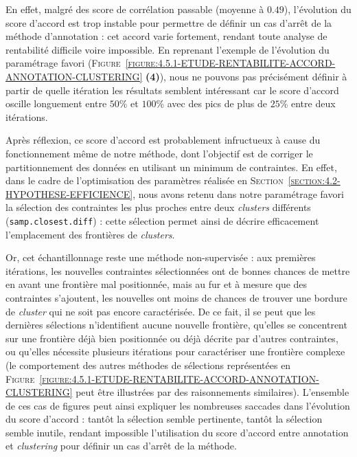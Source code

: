 			En effet, malgré des score de corrélation passable (moyenne à $0.49$), l'évolution du score d'accord est trop instable pour permettre de définir un cas d'arrêt de la méthode d'annotation : cet accord varie fortement, rendant toute analyse de rentabilité difficile voire impossible.
			En reprenant l'exemple de l'évolution du paramétrage favori (\textsc{Figure~\ref{figure:4.5.1-ETUDE-RENTABILITE-ACCORD-ANNOTATION-CLUSTERING}} \textbf{(4)}), nous ne pouvons pas précisément définir à partir de quelle itération les résultats semblent intéressant car le score d'accord oscille longuement entre $50$\% et $100$\% avec des pics de plus de $25$\% entre deux itérations.
			
			\begin{leftBarAuthorOpinion}
				Après réflexion, ce score d'accord est probablement infructueux à cause du fonctionnement même de notre méthode, dont l'objectif est de corriger le partitionnement des données en utilisant un minimum de contraintes.
				En effet, dans le cadre de l'optimisation des paramètres réalisée en \textsc{Section~\ref{section:4.2-HYPOTHESE-EFFICIENCE}}, nous avons retenu dans notre paramétrage favori la sélection des contraintes les plus proches entre deux \textit{clusters} différents (\texttt{samp.closest.diff}) : cette sélection permet ainsi de décrire efficacement l'emplacement des frontières de \textit{clusters}.
				
				Or, cet échantillonnage reste une méthode non-supervisée : aux premières itérations, les nouvelles contraintes sélectionnées ont de bonnes chances de mettre en avant une frontière mal positionnée, mais au fur et à mesure que des contraintes s'ajoutent, les nouvelles ont moins de chances de trouver une bordure de \textit{cluster} qui ne soit pas encore caractérisée.
				De ce fait, il se peut que les dernières sélections n'identifient aucune nouvelle frontière, qu'elles se concentrent sur une frontière déjà bien positionnée ou déjà décrite par d'autres contraintes, ou qu'elles nécessite plusieurs itérations pour caractériser une frontière complexe (le comportement des autres méthodes de sélections représentées en \textsc{Figure~\ref{figure:4.5.1-ETUDE-RENTABILITE-ACCORD-ANNOTATION-CLUSTERING}} peut être illustrées par des raisonnements similaires).
				L'ensemble de ces cas de figures peut ainsi expliquer les nombreuses saccades dans l'évolution du score d'accord : tantôt la sélection semble pertinente, tantôt la sélection semble inutile, rendant impossible l'utilisation du score d'accord entre annotation et \textit{clustering} pour définir un cas d'arrêt de la méthode.
			\end{leftBarAuthorOpinion}
			
